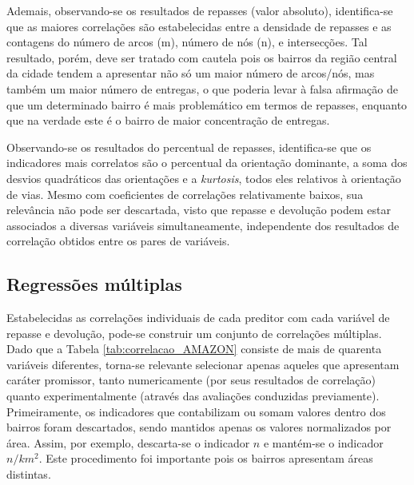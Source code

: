 Ademais, observando-se os resultados de repasses (valor absoluto), identifica-se que as maiores correlações são estabelecidas entre a densidade de repasses e as contagens do número de arcos (m), número de nós (n), e intersecções.
Tal resultado, porém, deve ser tratado com cautela pois os bairros da região central da cidade tendem a apresentar não só um maior número de arcos/nós, mas também um maior número de entregas, o que poderia levar à falsa afirmação de que um determinado bairro é mais problemático em termos de repasses, enquanto que na verdade este é o bairro de maior concentração de entregas.

Observando-se os resultados do percentual de repasses, identifica-se que os indicadores mais correlatos são o percentual da orientação dominante, a soma dos desvios quadráticos das orientações e a \textit{kurtosis}, todos eles relativos à orientação de vias.
Mesmo com coeficientes de correlações relativamente baixos, sua relevância não pode ser descartada, visto que repasse e devolução podem estar associados a diversas variáveis simultaneamente, independente dos resultados de correlação obtidos entre os pares de variáveis.

\subsection{Regressões múltiplas}

Estabelecidas as correlações individuais de cada preditor com cada variável de repasse e devolução, pode-se construir um conjunto de correlações múltiplas. 
%
Dado que a Tabela \ref{tab:correlacao_AMAZON} consiste de mais de quarenta variáveis diferentes, torna-se relevante selecionar apenas aqueles que apresentam caráter promissor, tanto numericamente (por seus resultados de correlação) quanto experimentalmente (através das avaliações conduzidas previamente).
Primeiramente, os indicadores que contabilizam ou somam valores dentro dos bairros foram descartados, sendo mantidos apenas os valores normalizados por área.
Assim, por exemplo, descarta-se o indicador $n$ e mantém-se o indicador $n/km^{2}$.
Este procedimento foi importante pois os bairros apresentam áreas distintas. %

